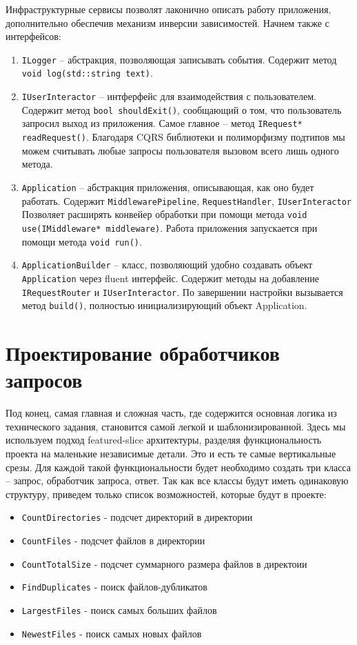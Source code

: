 Инфраструктурные сервисы позволят лаконично описать работу приложения, дополнительно обеспечив механизм инверсии зависимостей.
Начнем также с интерфейсов:
\begin{enumerate}
	\item \verb|ILogger| – абстракция, позволяющая записывать события. Содержит метод \verb|void log(std::string text)|.
	\item \verb|IUserInteractor| – интферфейс для взаимодействия с пользователем. Содержит метод \verb|bool shouldExit()|, сообщающий о том, что пользователь запросил выход из приложения. Самое главное – метод \verb|IRequest* readRequest()|. Благодаря CQRS библиотеки и полиморфизму подтипов мы можем считывать любые запросы пользователя вызовом всего лишь одного метода.
	\item \verb|Application| – абстракция приложения, описывающая, как оно будет работать. Содержит \verb|MiddlewarePipeline|, \verb|RequestHandler|, \verb|IUserInteractor| Позволяет расширять конвейер обработки при помощи метода \verb|void use(IMiddleware* middleware)|. Работа приложения запускается при помощи метода \verb|void run()|.
	\item \verb|ApplicationBuilder| – класс, позволяющий удобно создавать объект \verb|Application| через fluent интерфейс. Содержит методы на добавление \verb|IRequestRouter| и \verb|IUserInteractor|. По завершении настройки вызывается метод \verb|build()|, полностью инициализирующий объект Application.
\end{enumerate}

\newpage\section{Проектирование обработчиков запросов} \label{ch1:conclusion5}

Под конец, самая главная и сложная часть, где содержится основная логика из технического задания, становится самой легкой и шаблонизированной. Здесь мы используем подход featured-slice архитектуры, разделяя функциональность проекта на маленькие независимые детали. Это и есть те самые вертикальные срезы. Для каждой такой функциональности будет необходимо создать три класса – запрос, обработчик запроса, ответ. Так как все классы будут иметь одинаковую структуру, приведем только список возможностей, которые будут в проекте:

\begin{itemize}
	\item \verb|CountDirectories| - подсчет директорий в директории
	\item \verb|CountFiles| - подсчет файлов в директории
	\item \verb|CountTotalSize| - подсчет суммарного размера файлов в директоии
	\item \verb|FindDuplicates| - поиск файлов-дубликатов
	\item \verb|LargestFiles| - поиск самых больших файлов
	\item \verb|NewestFiles| - поиск самых новых файлов
\end{itemize}








